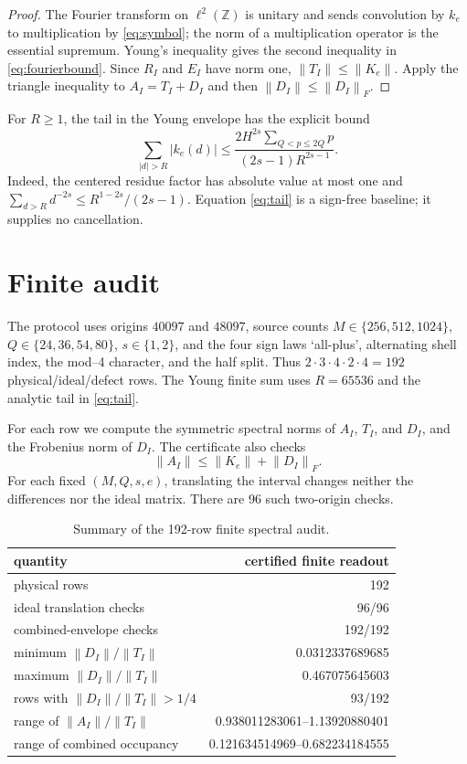 \documentclass[10pt]{article}
\newcommand{\Z}{\mathbb Z}
\newcommand{\norm}[1]{\left\lVert #1\right\rVert}
\begin{document}
\begin{proof}
The Fourier transform on $\ell^2(\Z)$ is unitary and sends convolution by
$k_e$ to multiplication by \eqref{eq:symbol}; the norm of a multiplication
operator is the essential supremum.  Young's inequality gives the second
inequality in \eqref{eq:fourierbound}.  Since $R_I$ and $E_I$ have norm one,
$\norm{T_I}\leq\norm{K_e}$.  Apply the triangle inequality to
$A_I=T_I+D_I$ and then $\norm{D_I}\leq\norm{D_I}_F$.
\end{proof}

For $R\geq1$, the tail in the Young envelope has the explicit bound
\begin{equation}
 \sum_{|d|>R}|k_e(d)|
 \leq \frac{2H^{2s}\sum_{Q<p\leq2Q}p}{(2s-1)R^{2s-1}}. \label{eq:tail}
\end{equation}
Indeed, the centered residue factor has absolute value at most one and
$\sum_{d>R}d^{-2s}\leq R^{1-2s}/(2s-1)$.  Equation \eqref{eq:tail} is a
sign-free baseline; it supplies no cancellation.

\section{Finite audit}

The protocol uses origins $40097$ and $48097$, source counts
$M\in\{256,512,1024\}$, $Q\in\{24,36,54,80\}$, $s\in\{1,2\}$, and the
four sign laws `all-plus', alternating shell index, the mod--4 character, and
the half split.  Thus
$2\cdot3\cdot4\cdot2\cdot4=192$ physical/ideal/defect rows.  The Young
finite sum uses $R=65536$ and the analytic tail in \eqref{eq:tail}.

For each row we compute the symmetric spectral norms of $A_I$, $T_I$, and
$D_I$, and the Frobenius norm of $D_I$.  The certificate also checks
\begin{equation}
 \norm{A_I}\leq\norm{K_e}+\norm{D_I}_F. \label{eq:finitecertificate}
\end{equation}
For each fixed $(M,Q,s,e)$, translating the interval changes neither the
differences nor the ideal matrix.  There are 96 such two-origin checks.

\begin{table}[t]
\centering
\caption{Summary of the 192-row finite spectral audit.}
\begin{tabular}{lr}
\toprule
quantity & certified finite readout \\
\midrule
physical rows & 192 \\
ideal translation checks & 96/96 \\
combined-envelope checks & 192/192 \\
minimum $\norm{D_I}/\norm{T_I}$ & 0.0312337689685 \\
maximum $\norm{D_I}/\norm{T_I}$ & 0.467075645603 \\
rows with $\norm{D_I}/\norm{T_I}>1/4$ & 93/192 \\
range of $\norm{A_I}/\norm{T_I}$ & 0.938011283061--1.13920880401 \\
range of combined occupancy & 0.121634514969--0.682234184555 \\
\bottomrule
\end{tabular}
\end{table}
\end{document}
